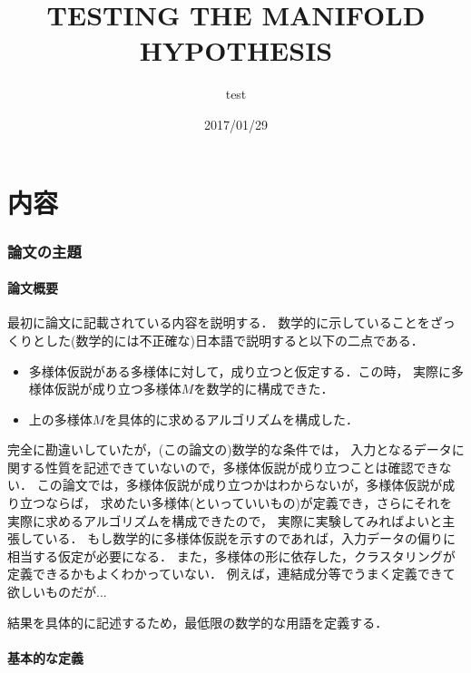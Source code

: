 \documentclass{ujarticle}
\title{TESTING THE MANIFOLD HYPOTHESIS}
\author{test}
\date{2017/01/29}
\begin{document}
\part{内容}

\section{論文の主題}
\label{論文の主題}


\subsection{論文概要}
\label{sub:論文概要}

最初に論文に記載されている内容を説明する．
数学的に示していることをざっくりとした(数学的には不正確な)日本語で説明すると以下の二点である．
\begin{itemize}
  \item 多様体仮説がある多様体に対して，成り立つと仮定する．この時，
  実際に多様体仮説が成り立つ多様体$M$を数学的に構成できた．
  \item 上の多様体$M$を具体的に求めるアルゴリズムを構成した．
\end{itemize}

完全に勘違いしていたが，(この論文の)数学的な条件では，
入力となるデータに関する性質を記述できていないので，多様体仮説が成り立つことは確認できない．
この論文では，多様体仮説が成り立つかはわからないが，多様体仮説が成り立つならば，
求めたい多様体(といっていいもの)が定義でき，さらにそれを実際に求めるアルゴリズムを構成できたので，
実際に実験してみればよいと主張している．
もし数学的に多様体仮説を示すのであれば，入力データの偏りに相当する仮定が必要になる．
また，多様体の形に依存した，クラスタリングが定義できるかもよくわかっていない．
例えば，連結成分等でうまく定義できて欲しいものだが...

結果を具体的に記述するため，最低限の数学的な用語を定義する．
\subsection{基本的な定義}
\label{sub:基本的な定義}
\end{document}

